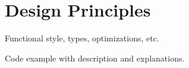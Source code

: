 \section{Design Principles}

Functional style, types, optimizations, etc.

Code example with description and explanations.